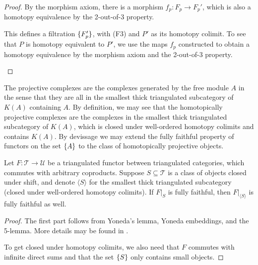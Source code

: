 \documentclass[../thesis.tex]{subfiles}
\begin{document}
\begin{proof}
                By the morphism axiom, there is a morphism $f_p: F_p \rightarrow F_{p}'$, which is also a homotopy equivalence by the 2-out-of-3 property.

                This defines a filtration $\{F_p'\}$, with (F3) and $P'$ as its homotopy colimit. To see that $P$ is homotopy equivalent to $P'$, we use the maps $f_p$ constructed to obtain a homotopy equivalence by the morphism axiom and the 2-out-of-3 property.

                \begin{center}
                \end{center}
            \end{proof}

            The projective complexes are the complexes generated by the free module $A$ in the sense that they are all in the smallest thick triangulated subcategory of $K(A)$ containing $A$. By definition, we may see that the homotopically projective complexes are the complexes in the smallest thick triangulated subcategory of $K(A)$, which is closed under well-ordered homotopy colimits and contains $K(A)$. By devissage we may extend the fully faithful property of functors on the set $\{A\}$ to the class of homotopically projective objects.

            \begin{lemma}[Devissage]
                Let $F: \mathcal{T} \rightarrow \mathcal{U}$ be a triangulated functor between triangulated categories, which commutes with arbitrary coproducts. Suppose $S\subseteq \mathcal{T}$ is a class of objects closed under shift, and denote $\langle S \rangle$ for the smallest thick triangulated subcategory (closed under well-ordered homotopy colimits). If $F|_S$ is fully faithful, then $F|_{\langle S \rangle}$ is fully faithful as well.
            \end{lemma}

            \begin{proof}
                 The first part follows from Yoneda's lemma, Yoneda embeddings, and the 5-lemma. More details may be found in \cite{Krause21}. 
                 
                 To get closed under homotopy colimits, we also need that $F$ commutes with infinite direct sums and that the set $\{S\}$ only contains small objects.
            \end{proof}
\end{document}
